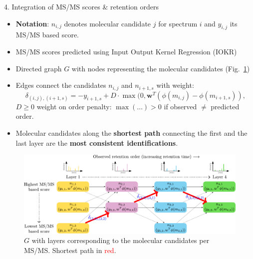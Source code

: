 \documentclass{beamer}
\begin{document}
\begin{frame}{}
\begin{columns}[T]
\begin{column}{.52\linewidth}
\begin{block}       {{\normalsize 4. Integration of MS/MS scores \& retention orders}}
\begin{itemize}
                    \setlength\itemsep{0.25em}
                    \item \textbf{Notation}: $n_{i,j}$ denotes molecular candidate $j$ for spectrum $i$ and $y_{i,j}$ its MS/MS based score.
                    \item MS/MS scores predicted using Input Output Kernel Regression (IOKR) \citep{Brouard2016}
                    \item Directed graph $G$ with nodes representing the molecular candidates (Fig.~\ref{fig:dynamic_programming})
                    \item Edges connect the candidates $n_{i,j}$ and $n_{i+1,s}$ with weight:
\begin{equation}
                    \delta_{(i,j),(i+1,s)}=-y_{i+1,s}+D\cdot\max(0,\mathbf{w}^T(\phi(m_{i,j})-\phi(m_{i+1,s})),
\end{equation}                     
                    $D\geq 0$ weight on order penalty: $\max(\ldots)>0$ if observed $\neq$ predicted order.
                    \item Molecular candidates along the \textbf{shortest path} connecting the first and the last layer are the \textbf{most consistent identifications}.
\end{itemize}
\begin{figure}
                    \centering
                    \includegraphics[width=.98\textwidth]{images/dynamic_programming_simple_2.pdf}
                    \caption{$G$ with layers corresponding to the molecular candidates per MS/MS. Shortest path in \textcolor{red}{red}.}
                    \label{fig:dynamic_programming}
\end{figure}
\end{block}


\end{column}
\end{columns}
\end{frame}
\end{document}
